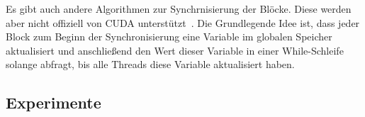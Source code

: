 \documentclass{scrartcl}
\begin{document}
Es gibt auch andere Algorithmen zur Synchrnisierung der Blöcke. Diese werden aber nicht offiziell von CUDA unterstützt~\cite{interblockgpusync}.
Die Grundlegende Idee ist, dass jeder Block zum Beginn der Synchronisierung eine Variable im globalen Speicher aktualisiert und anschließend den Wert dieser Variable in einer While-Schleife solange abfragt, bis alle Threads diese Variable aktualisiert haben.
\subsection{Experimente}

\pagebreak
\nocite{parallelreduction}
\nocite{interblockgpusync}
\nocite{introductiontosvm}
\nocite{diplomarbeit}
\nocite{libsvm}
\nocite{cudaprogrammingguide}


{}

\end{document}
